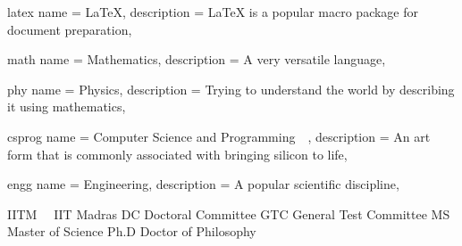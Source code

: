 \newglossaryentry
    {latex}
    {
        name        = {\LaTeX},
        description = {{\LaTeX} is a popular macro package for document preparation},
    }

\newglossaryentry
    {math}
    {
        name        = {Mathematics},
        description = {A very versatile language},
    }

\newglossaryentry
    {phy}
    {
        name        = {Physics},
        description = {Trying to understand the world by describing it using mathematics},
    }

\newglossaryentry
    {csprog}
    {
        name        = {Computer Science and Programming\ \ },
        description = {An art form that is commonly associated with bringing silicon to life},
    }

\newglossaryentry
    {engg}
    {
        name        = {Engineering},
        description = {A popular scientific discipline},
    }

 {IITM\ \ } {IIT Madras}
   {DC}       {Doctoral Committee}
  {GTC}      {General Test Committee}
   {MS}       {Master of Science}
  {Ph.D}     {Doctor of Philosophy}
